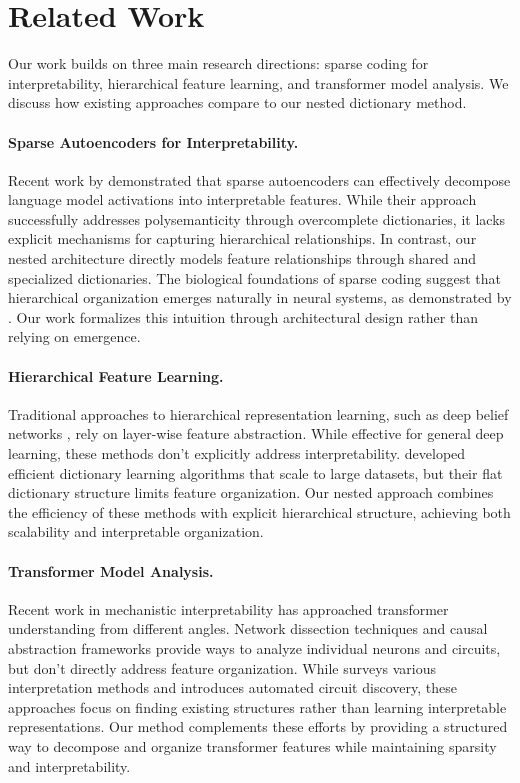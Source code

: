 \documentclass{article} %
\begin{document}
\section{Related Work}
\label{sec:related}

Our work builds on three main research directions: sparse coding for interpretability, hierarchical feature learning, and transformer model analysis. We discuss how existing approaches compare to our nested dictionary method.

\paragraph{Sparse Autoencoders for Interpretability.} Recent work by \cite{Cunningham2023SparseAF} demonstrated that sparse autoencoders can effectively decompose language model activations into interpretable features. While their approach successfully addresses polysemanticity through overcomplete dictionaries, it lacks explicit mechanisms for capturing hierarchical relationships. In contrast, our nested architecture directly models feature relationships through shared and specialized dictionaries. The biological foundations of sparse coding \cite{Olshausen1996EmergenceOS, Bell1996EdgesAT} suggest that hierarchical organization emerges naturally in neural systems, as demonstrated by \cite{Ruslim2024EmergenceOS}. Our work formalizes this intuition through architectural design rather than relying on emergence.

\paragraph{Hierarchical Feature Learning.} Traditional approaches to hierarchical representation learning, such as deep belief networks \cite{Lee2011UnsupervisedLO}, rely on layer-wise feature abstraction. While effective for general deep learning, these methods don't explicitly address interpretability. \cite{Mairal2009OnlineDL, Mairal2009OnlineLF} developed efficient dictionary learning algorithms that scale to large datasets, but their flat dictionary structure limits feature organization. Our nested approach combines the efficiency of these methods with explicit hierarchical structure, achieving both scalability and interpretable organization.

\paragraph{Transformer Model Analysis.} Recent work in mechanistic interpretability has approached transformer understanding from different angles. Network dissection techniques \cite{Bau2017NetworkDQ} and causal abstraction frameworks \cite{Geiger2023CausalAA} provide ways to analyze individual neurons and circuits, but don't directly address feature organization. While \cite{Rai2024APR} surveys various interpretation methods and \cite{Bhaskar2024FindingTC} introduces automated circuit discovery, these approaches focus on finding existing structures rather than learning interpretable representations. Our method complements these efforts by providing a structured way to decompose and organize transformer features while maintaining sparsity and interpretability.
\end{document}
